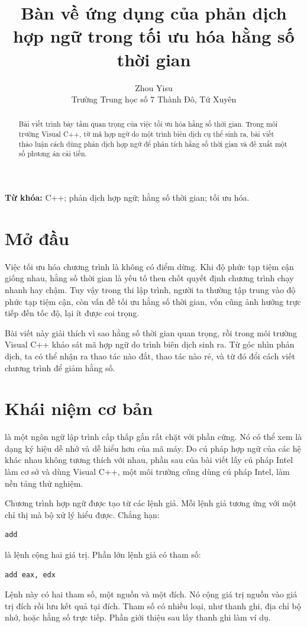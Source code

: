 \documentclass[11pt]{article}
\title{Bàn về ứng dụng của phản dịch hợp ngữ trong tối ưu hóa hằng số thời gian}
\author{Zhou Yisu \\ Trường Trung học số 7 Thành Đô, Tứ Xuyên}
\date{}
\begin{document}
\maketitle


\begin{abstract}
Bài viết trình bày tầm quan trọng của việc tối ưu hóa hằng số thời gian.
Trong môi trường Visual C++, từ mã hợp ngữ do một trình biên dịch cụ thể sinh
ra, bài viết thảo luận cách dùng phản dịch hợp ngữ để phân tích hằng số thời
gian và đề xuất một số phương án cải tiến.
\end{abstract}

\noindent\textbf{Từ khóa:} C++; phản dịch hợp ngữ; hằng số thời gian; tối ưu
hóa.

\section{Mở đầu}

Việc tối ưu hóa chương trình là không có điểm dừng. Khi độ phức tạp tiệm cận
giống nhau, hằng số thời gian là yếu tố then chốt quyết định chương trình chạy
nhanh hay chậm. Tuy vậy trong thi lập trình, người ta thường tập trung vào độ
phức tạp tiệm cận, còn vấn đề tối ưu hằng số thời gian, vốn cũng ảnh hưởng
trực tiếp đến tốc độ, lại ít được coi trọng.

Bài viết này giải thích vì sao hằng số thời gian quan trọng, rồi trong môi
trường Visual C++ khảo sát mã hợp ngữ do trình biên dịch sinh ra. Từ góc nhìn
phản dịch, ta có thể nhận ra thao tác nào đắt, thao tác nào rẻ, và từ đó đổi
cách viết chương trình để giảm hằng số.

\section{Khái niệm cơ bản}

 là một ngôn ngữ lập trình cấp thấp gắn rất chặt với phần cứng.
Nó có thể xem là dạng ký hiệu dễ nhớ và dễ hiểu hơn của mã máy. Do cú pháp hợp
ngữ của các hệ khác nhau không tương thích với nhau, phần sau của bài viết lấy
cú pháp Intel làm cơ sở và dùng Visual C++, một môi trường cũng dùng cú pháp
Intel, làm nền tảng thử nghiệm.

Chương trình hợp ngữ được tạo từ các lệnh giả. Mỗi lệnh giả tương ứng với một
chỉ thị mà bộ xử lý hiểu được. Chẳng hạn:
\begin{verbatim}
add
\end{verbatim}
là lệnh cộng hai giá trị. Phần lớn lệnh giả có tham số:
\begin{verbatim}
add eax, edx
\end{verbatim}
Lệnh này có hai tham số, một nguồn và một đích. Nó cộng giá trị nguồn vào giá
trị đích rồi lưu kết quả tại đích. Tham số có nhiều loại, như thanh ghi, địa
chỉ bộ nhớ, hoặc hằng số trực tiếp. Phần giới thiệu sau lấy thanh ghi làm ví
dụ.
\end{document}
